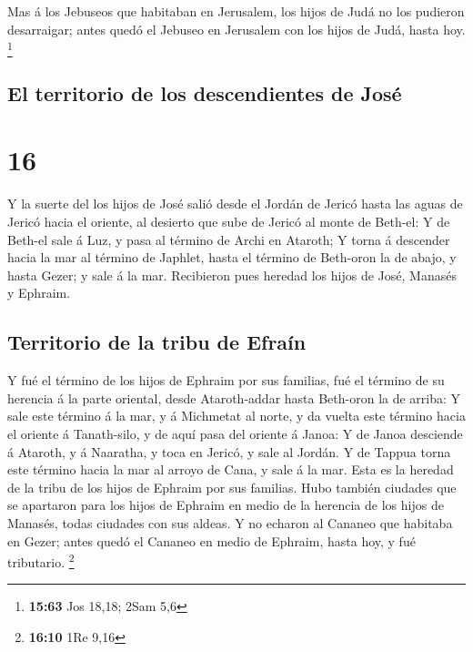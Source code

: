  Mas á los Jebuseos que habitaban en Jerusalem, los hijos
de Judá no los pudieron desarraigar; antes quedó el Jebuseo en Jerusalem
con los hijos de Judá, hasta hoy. \footnote{\textbf{15:63} Jos 18,18;
  2Sam 5,6}

\hypertarget{el-territorio-de-los-descendientes-de-josuxe9}{%
\subsection{El territorio de los descendientes de
José}\label{el-territorio-de-los-descendientes-de-josuxe9}}

\hypertarget{section-15}{%
\section{16}\label{section-15}}

 Y la suerte del los hijos de José salió desde el Jordán
de Jericó hasta las aguas de Jericó hacia el oriente, al desierto que
sube de Jericó al monte de Beth-el:  Y de Beth-el sale á
Luz, y pasa al término de Archi en Ataroth;  Y torna á
descender hacia la mar al término de Japhlet, hasta el término de
Beth-oron la de abajo, y hasta Gezer; y sale á la mar. 
Recibieron pues heredad los hijos de José, Manasés y Ephraim.

\hypertarget{territorio-de-la-tribu-de-efrauxedn}{%
\subsection{Territorio de la tribu de
Efraín}\label{territorio-de-la-tribu-de-efrauxedn}}

 Y fué el término de los hijos de Ephraim por sus
familias, fué el término de su herencia á la parte oriental, desde
Ataroth-addar hasta Beth-oron la de arriba:  Y sale este
término á la mar, y á Michmetat al norte, y da vuelta este término hacia
el oriente á Tanath-silo, y de aquí pasa del oriente á Janoa:
 Y de Janoa desciende á Ataroth, y á Naaratha, y toca en
Jericó, y sale al Jordán.  Y de Tappua torna este término
hacia la mar al arroyo de Cana, y sale á la mar. Esta es la heredad de
la tribu de los hijos de Ephraim por sus familias.  Hubo
también ciudades que se apartaron para los hijos de Ephraim en medio de
la herencia de los hijos de Manasés, todas ciudades con sus aldeas.
 Y no echaron al Cananeo que habitaba en Gezer; antes
quedó el Cananeo en medio de Ephraim, hasta hoy, y fué tributario.
\footnote{\textbf{16:10} 1Re 9,16}

